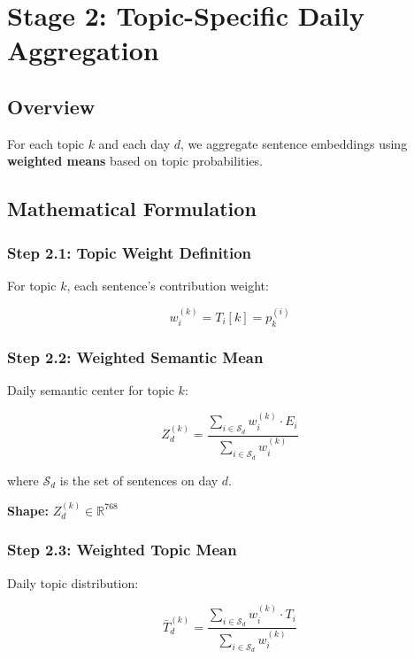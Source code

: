 \documentclass[12pt]{article}
\begin{document}
\section{Stage 2: Topic-Specific Daily Aggregation}

\subsection{Overview}

For each topic $k$ and each day $d$, we aggregate sentence embeddings using \textbf{weighted means} based on topic probabilities.

\subsection{Mathematical Formulation}

\subsubsection{Step 2.1: Topic Weight Definition}

For topic $k$, each sentence's contribution weight:

\begin{equation}
w_i^{(k)} = T_i[k] = p_k^{(i)}
\end{equation}

\subsubsection{Step 2.2: Weighted Semantic Mean}

Daily semantic center for topic $k$:

\begin{equation}
Z_d^{(k)} = \frac{\sum_{i \in \mathcal{S}_d} w_i^{(k)} \cdot E_i}{\sum_{i \in \mathcal{S}_d} w_i^{(k)}}
\end{equation}

where $\mathcal{S}_d$ is the set of sentences on day $d$.

\textbf{Shape:} $Z_d^{(k)} \in \mathbb{R}^{768}$

\subsubsection{Step 2.3: Weighted Topic Mean}

Daily topic distribution:

\begin{equation}
\bar{T}_d^{(k)} = \frac{\sum_{i \in \mathcal{S}_d} w_i^{(k)} \cdot T_i}{\sum_{i \in \mathcal{S}_d} w_i^{(k)}}
\end{equation}
\end{document}
